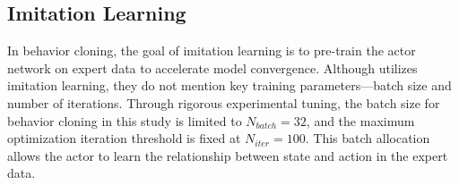     \subsection{Imitation Learning}
    In behavior cloning, the goal of imitation learning is to pre-train the actor network on expert data to accelerate model convergence. Although \cite{elallid_improving_2024} utilizes imitation learning, they do not mention key training parameters—batch size and number of iterations. Through rigorous experimental tuning, the batch size for behavior cloning in this study is limited to $N_{batch} = 32$, and the maximum optimization iteration threshold is fixed at $N_{iter} = 100$. This batch allocation allows the actor to learn the relationship between state and action in the expert data.